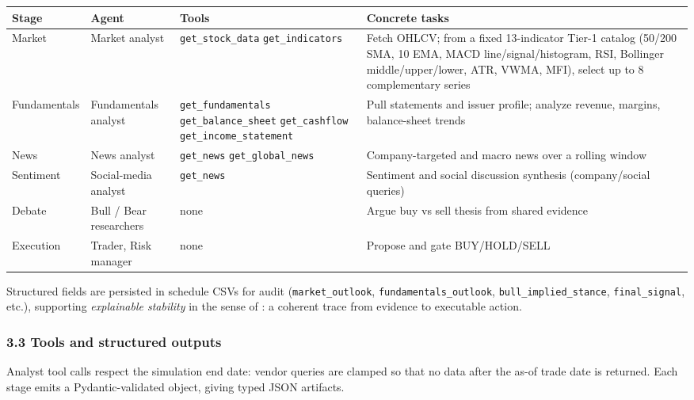\documentclass{article}
\begin{document}
{\small
\begin{tabular}{@{} l p{2.2cm} p{3.3cm} p{3.3cm} @{}}
\toprule
Stage & Agent & Tools & Concrete tasks \\
\midrule
Market & Market analyst &
  \texttt{get\_stock\_data}\newline
  \texttt{get\_indicators} &
Fetch OHLCV; from a fixed 13-indicator Tier-1 catalog
(50/200 SMA, 10 EMA, MACD line/signal/histogram, RSI,
Bollinger middle/upper/lower, ATR, VWMA, MFI),
select up to 8 complementary series \\
\addlinespace
Fundamentals & Fundamentals analyst &
  \texttt{get\_fundamentals}\newline
  \texttt{get\_balance\_sheet}\newline
  \texttt{get\_cashflow}\newline
  \texttt{get\_income\_statement} &
  Pull statements and issuer profile;
  analyze revenue, margins, balance-sheet trends \\
\addlinespace
News & News analyst &
  \texttt{get\_news}\newline
  \texttt{get\_global\_news} &
  Company-targeted and macro news over a rolling window \\
\addlinespace
Sentiment & Social-media analyst &
  \texttt{get\_news} &
  Sentiment and social discussion synthesis
  (company/social queries) \\
\addlinespace
Debate & Bull / Bear researchers &
  none &
  Argue buy vs sell thesis from shared evidence \\
\addlinespace
Execution & Trader, Risk manager &
  none &
  Propose and gate BUY/HOLD/SELL \\
\bottomrule
\end{tabular}
}

Structured fields are persisted in schedule CSVs for audit
(\texttt{market\_outlook}, \texttt{fundamentals\_outlook},
\texttt{bull\_implied\_stance}, \texttt{final\_signal}, etc.), supporting
\emph{explainable stability} in the sense of \citet{dewansh2026policy}: a
coherent trace from evidence to executable action.

\subsubsection{3.3 Tools and structured outputs}\label{tools-and-structured-outputs}

Analyst tool calls respect the simulation end date: vendor queries are
clamped so that no data after the as-of trade date is returned. Each
stage emits a Pydantic-validated object, giving typed JSON
artifacts.
\end{document}
